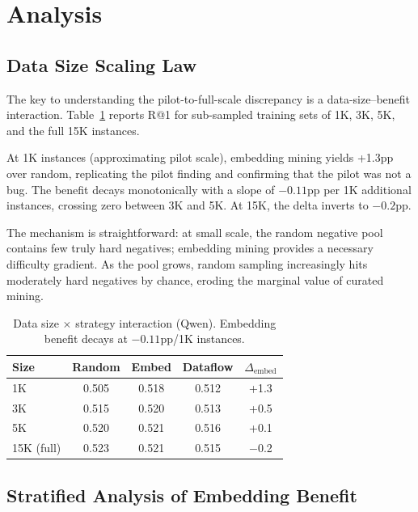 \documentclass[11pt,a4paper]{article}
\begin{document}
\section{Analysis}
\label{sec:analysis}

\subsection{Data Size Scaling Law}
\label{sec:scaling}

The key to understanding the pilot-to-full-scale discrepancy is a data-size--benefit interaction.
Table~\ref{tab:scaling} reports R@1 for sub-sampled training sets of 1K, 3K, 5K, and the full 15K instances.

At 1K instances (approximating pilot scale), embedding mining yields +1.3pp over random, replicating the pilot finding and confirming that the pilot was not a bug.
The benefit decays monotonically with a slope of $-0.11$pp per 1K additional instances, crossing zero between 3K and 5K.
At 15K, the delta inverts to $-0.2$pp.

The mechanism is straightforward: at small scale, the random negative pool contains few truly hard negatives; embedding mining provides a necessary difficulty gradient.
As the pool grows, random sampling increasingly hits moderately hard negatives by chance, eroding the marginal value of curated mining.

\begin{table}[t]
\centering
\small
\caption{Data size $\times$ strategy interaction (Qwen). Embedding benefit decays at $-0.11$pp/1K instances.}
\label{tab:scaling}
\begin{tabular}{lcccc}
\toprule
Size & Random & Embed & Dataflow & $\Delta_\text{embed}$ \\
\midrule
1K         & 0.505 & 0.518 & 0.512 & +1.3 \\
3K         & 0.515 & 0.520 & 0.513 & +0.5 \\
5K         & 0.520 & 0.521 & 0.516 & +0.1 \\
15K (full) & 0.523 & 0.521 & 0.515 & $-$0.2 \\
\bottomrule
\end{tabular}
\end{table}

\subsection{Stratified Analysis of Embedding Benefit}
\label{sec:stratified}
\end{document}
